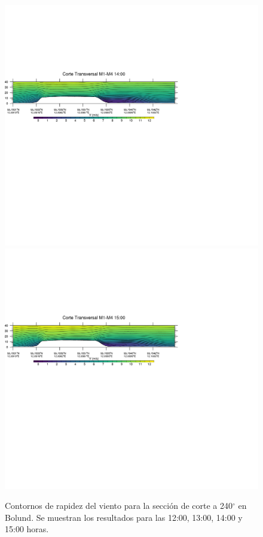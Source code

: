 \begin{figure}[H]
	\includegraphics[width=0.90\linewidth,trim={0mm 202.0mm 111mm 106mm},clip]{Imagenes/06/bol/1400rot}\\%
	\includegraphics[width=0.90\linewidth,trim={0mm 180.0mm 111mm 106mm},clip]{Imagenes/06/bol/1500rot}%
	\caption{Contornos de rapidez del viento para la sección de corte a 240$^\circ$ en Bolund. Se muestran los resultados para las 12:00, 13:00, 14:00 y 15:00 horas.}
	\label{fig:06_bol_cross}
\end{figure}

